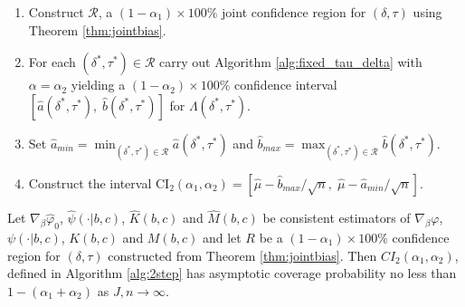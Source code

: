\begin{alg}
\mbox{}
\begin{enumerate}
  \item Construct $\mathscr{R}$, a $(1-\alpha_1)\times 100\%$ joint confidence region for $(\delta,\tau)$ using Theorem \ref{thm:jointbias}.
  \item For each $(\delta^*,\tau^*)\in \mathscr{R}$ carry out Algorithm \ref{alg:fixed_tau_delta} with $\alpha = \alpha_2$ yielding a $(1 - \alpha_2) \times 100\%$ confidence interval $\left[ \widehat{a}(\delta^*,\tau^*),\; \widehat{b}(\delta^*,\tau^*) \right]$ for $\Lambda(\delta^*, \tau^*)$. 
  \item Set $\displaystyle \widehat{a}_{min} = \min_{(\delta^*,\tau^*)\in \mathscr{R}} \widehat{a}(\delta^*,\tau^*)$ and $\displaystyle \widehat{b}_{max} = \max_{(\delta^*,\tau^*)\in \mathscr{R}} \widehat{b}(\delta^*, \tau^*)$.
  \item Construct the interval $\mbox{CI}_2(\alpha_1, \alpha_2) = \left[ \widehat{\mu} - \widehat{b}_{max}/\sqrt{n}, \; \widehat{\mu} - \widehat{a}_{min}/\sqrt{n} \right]$.
\end{enumerate}
\label{alg:2step}
\end{alg}

\begin{thm}
\label{thm:sim}
Let $\nabla_{\beta}\widehat{\varphi}_0$, $\widehat{\psi}(\cdot|b,c)$, $\widehat{K}(b,c)$ and $\widehat{M}(b,c)$ be consistent estimators of $\nabla_\beta \varphi$, $\psi(\cdot|b,c)$, $K(b,c)$ and $M(b,c)$ and let $R$ be a $(1-\alpha_1)\times 100\%$ confidence region for $(\delta,\tau)$ constructed from Theorem \ref{thm:jointbias}.
Then $CI_2(\alpha_1, \alpha_2)$, defined in Algorithm \ref{alg:2step} has asymptotic coverage probability no less than $1-\left( \alpha_1 + \alpha_2 \right)$ as $J,n\rightarrow \infty$. 
\end{thm}

